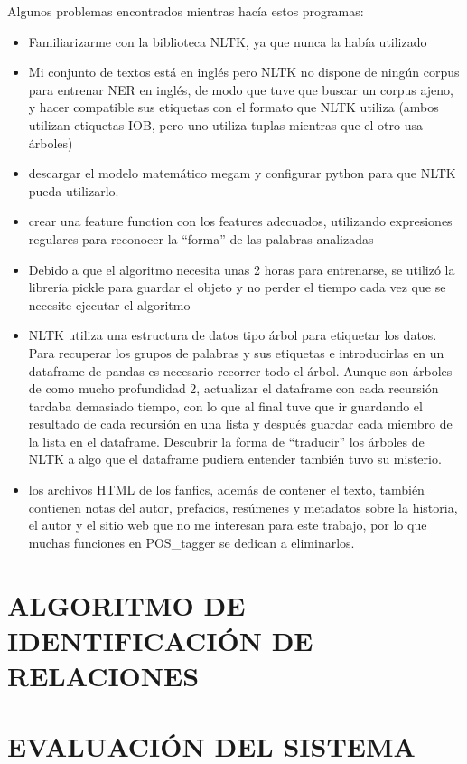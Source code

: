 \documentclass{pre-tfg}
\begin{document}
Algunos problemas encontrados mientras hacía estos programas:
\begin{itemize}
	\item Familiarizarme con la biblioteca NLTK, ya que nunca la había utilizado
	\item Mi conjunto de textos está en inglés pero NLTK no dispone de ningún corpus para entrenar NER en inglés, de modo que tuve que buscar un corpus ajeno, y hacer compatible sus etiquetas con el formato que NLTK utiliza (ambos utilizan etiquetas IOB, pero uno utiliza tuplas mientras que el otro usa árboles)
	\item descargar el modelo matemático megam y configurar python para que NLTK pueda utilizarlo.
	\item crear una feature function con los features adecuados, utilizando expresiones regulares para reconocer la “forma” de las palabras analizadas
	\item Debido a que el algoritmo necesita unas 2 horas para entrenarse, se utilizó la librería pickle para guardar el objeto y no perder el tiempo cada vez que se necesite ejecutar el algoritmo
	\item NLTK utiliza una estructura de datos tipo árbol para etiquetar los datos. Para recuperar los grupos de palabras y sus etiquetas e introducirlas en un dataframe de pandas es necesario recorrer todo el árbol. Aunque son árboles de como mucho profundidad 2, actualizar el dataframe con cada recursión tardaba demasiado tiempo, con lo que al final tuve que ir guardando el resultado de cada recursión en una lista y después guardar cada miembro de la lista en el dataframe. Descubrir la forma de “traducir” los árboles de NLTK a algo que el dataframe pudiera entender también tuvo su misterio.
	\item los archivos HTML de los fanfics, además de contener el texto, también contienen notas del autor, prefacios, resúmenes y metadatos sobre la historia, el autor y el sitio web que no me interesan para este trabajo, por lo que muchas funciones en POS\_tagger se dedican a eliminarlos.
\end{itemize}

\section{ALGORITMO DE IDENTIFICACIÓN DE RELACIONES}

\section{EVALUACIÓN DEL SISTEMA}
\end{document}

